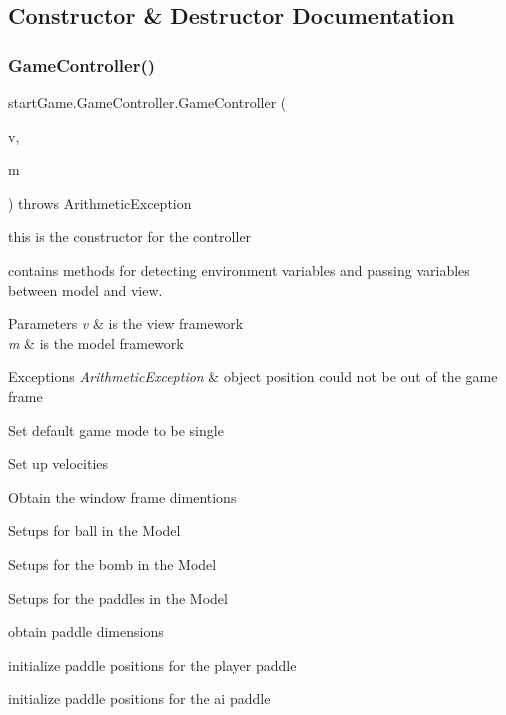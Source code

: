 \subsection{Constructor \& Destructor Documentation}
\hypertarget{classstart_game_1_1_game_controller_aecc647e49ed23b571160d7d7c68b04d7}{}\label{classstart_game_1_1_game_controller_aecc647e49ed23b571160d7d7c68b04d7} 
\subsubsection{\texorpdfstring{Game\+Controller()}{GameController()}}
{\footnotesize\ttfamily start\+Game.\+Game\+Controller.\+Game\+Controller (\begin{DoxyParamCaption}\item[{\hyperlink{classview_1_1_game_view}{Game\+View}}]{v,  }\item[{\hyperlink{classmodel_1_1_game_model}{Game\+Model}}]{m }\end{DoxyParamCaption}) throws Arithmetic\+Exception}



this is the constructor for the controller 

contains methods for detecting environment variables and passing variables between model and view. 
\begin{DoxyParams}{Parameters}
{\em v} & is the view framework \\
\hline
{\em m} & is the model framework \\
\hline
\end{DoxyParams}

\begin{DoxyExceptions}{Exceptions}
{\em Arithmetic\+Exception} & object position could not be out of the game frame \\
\hline
\end{DoxyExceptions}
Set default game mode to be single

Set up velocities

Obtain the window frame dimentions

Setups for ball in the Model

Setups for the bomb in the Model

Setups for the paddles in the Model
\begin{DoxyItemize}
\item obtain paddle dimensions
\item initialize paddle positions for the player paddle
\item initialize paddle positions for the ai paddle
\end{DoxyItemize}

